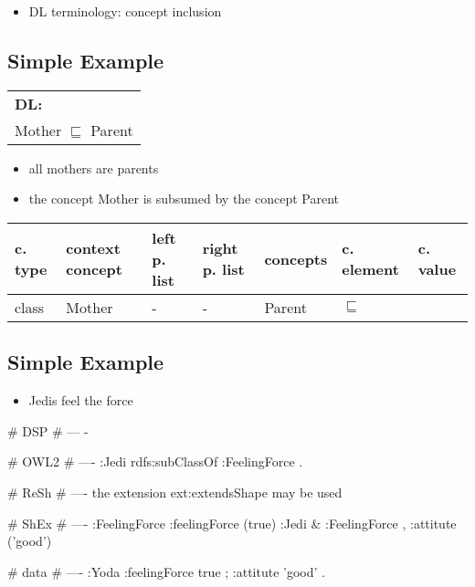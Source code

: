 \documentclass{llncs}
\newenvironment{gcotable}{
  \scriptsize
  \sffamily
  \vspace{0.3cm}
  \begin{tabular}{l|l|l|l|l|l|l}
  \hline
  \textbf{c. type} & \textbf{context concept} & \textbf{left p. list} & \textbf{right p. list} & \textbf{concepts} & \textbf{c. element} & \textbf{c. value} \\
  \hline

}{
  \hline
  \end{tabular}
  \linebreak
}
\newenvironment{DL}{
  \scriptsize
  \sffamily
  \vspace{0.3cm}
  \begin{tabular}{l}
	\textbf{DL:} \\

}{
  \end{tabular}
  \linebreak
}
\begin{document}
\begin{itemize}
	\item DL terminology: concept inclusion
\end{itemize}

\subsection{Simple Example}

\begin{DL}
Mother $\sqsubseteq$ Parent 
\end{DL}

\begin{itemize}
	\item all mothers are parents
  \item the concept Mother is subsumed by the concept Parent
\end{itemize}

\begin{gcotable}
class & Mother & - & - & Parent & $\sqsubseteq$ \\
\end{gcotable}

\subsection{Simple Example}

\begin{itemize}
	\item Jedis feel the force 
\end{itemize}

\begin{ex}
# DSP
# ---
-
\end{ex}

\begin{ex}
# OWL2
# ----
:Jedi rdfs:subClassOf :FeelingForce .
\end{ex}

\begin{ex}
# ReSh
# ----
the extension ext:extendsShape may be used
\end{ex}

\begin{ex}
# ShEx
# ----
:FeelingForce {
    :feelingForce (true) }
:Jedi {
    & :FeelingForce ,
    :attitute ('good') }
\end{ex}

\begin{ex}
# data
# ----
:Yoda 
    :feelingForce true ;
    :attitute 'good' .
\end{ex}
\end{document}
